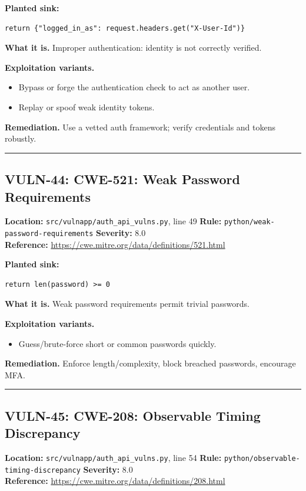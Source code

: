\documentclass[11pt,a4paper]{article}
\begin{document}
\noindent\textbf{Planted sink:}
\begin{lstlisting}
return {"logged_in_as": request.headers.get("X-User-Id")}
\end{lstlisting}
\noindent\textbf{What it is.} Improper authentication: identity is not correctly verified.

\noindent\textbf{Exploitation variants.}
\begin{itemize}[leftmargin=1.4em,itemsep=1pt,topsep=2pt]
\item Bypass or forge the authentication check to act as another user.
\item Replay or spoof weak identity tokens.
\end{itemize}
\noindent\textbf{Remediation.} Use a vetted auth framework; verify credentials and tokens robustly.

\vspace{4pt}\hrule\vspace{6pt}
\subsection{VULN-44: CWE-521: Weak Password Requirements}
\noindent\textbf{Location:} \texttt{src/vulnapp/auth\_api\_vulns.py}, line 49 \quad \textbf{Rule:} \texttt{python/weak-password-requirements} \quad \textbf{Severity:} 8.0
\\ \textbf{Reference:} \url{https://cwe.mitre.org/data/definitions/521.html}

\noindent\textbf{Planted sink:}
\begin{lstlisting}
return len(password) >= 0
\end{lstlisting}
\noindent\textbf{What it is.} Weak password requirements permit trivial passwords.

\noindent\textbf{Exploitation variants.}
\begin{itemize}[leftmargin=1.4em,itemsep=1pt,topsep=2pt]
\item Guess/brute-force short or common passwords quickly.
\end{itemize}
\noindent\textbf{Remediation.} Enforce length/complexity, block breached passwords, encourage MFA.

\vspace{4pt}\hrule\vspace{6pt}
\subsection{VULN-45: CWE-208: Observable Timing Discrepancy}
\noindent\textbf{Location:} \texttt{src/vulnapp/auth\_api\_vulns.py}, line 54 \quad \textbf{Rule:} \texttt{python/observable-timing-discrepancy} \quad \textbf{Severity:} 8.0
\\ \textbf{Reference:} \url{https://cwe.mitre.org/data/definitions/208.html}
\end{document}

